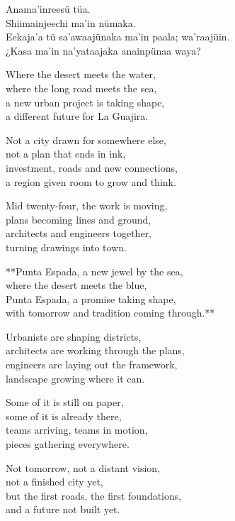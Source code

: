 \begin{lyrics}

Anama'inreesü tüa.\\
Shiimainjeechi ma'in nümaka.\\
Eekaja'a tü sa'awaajünaka ma'in paala; wa'raajüin.\\
¿Kasa ma'in na'yataajaka anainpünaa waya?


Where the desert meets the water,\\
where the long road meets the sea,\\
a new urban project is taking shape,\\
a different future for La Guajira.

Not a city drawn for somewhere else,\\
not a plan that ends in ink,\\
investment, roads and new connections,\\
a region given room to grow and think.


Mid twenty-four, the work is moving,\\
plans becoming lines and ground,\\
architects and engineers together,\\
turning drawings into town.


**Punta Espada, a new jewel by the sea,\\
where the desert meets the blue,\\
Punta Espada, a promise taking shape,\\
with tomorrow and tradition coming through.**


Urbanists are shaping districts,\\
architects are working through the plans,\\
engineers are laying out the framework,\\
landscape growing where it can.

Some of it is still on paper,\\
some of it is already there,\\
teams arriving, teams in motion,\\
pieces gathering everywhere.

Not tomorrow, not a distant vision,\\
not a finished city yet,\\
but the first roads, the first foundations,\\
and a future not built yet.


\end{lyrics}
